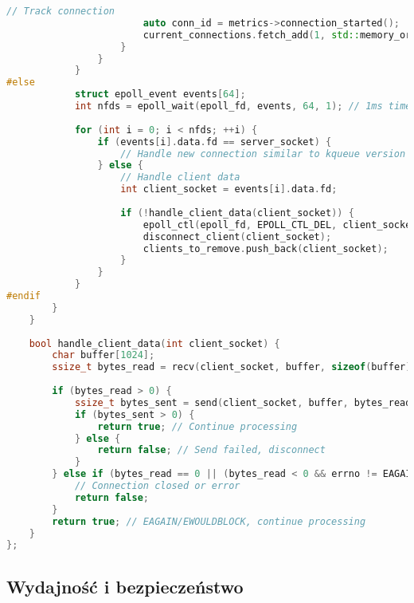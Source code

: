 \begin{lstlisting}[language=C++, caption={Async Echo Serwer w C++ z event loop}, label={lst:cpp_async_echo_server}]
                        // Track connection
                        auto conn_id = metrics->connection_started();
                        current_connections.fetch_add(1, std::memory_order_relaxed);
                    }
                }
            }
#else
            struct epoll_event events[64];
            int nfds = epoll_wait(epoll_fd, events, 64, 1); // 1ms timeout
            
            for (int i = 0; i < nfds; ++i) {
                if (events[i].data.fd == server_socket) {
                    // Handle new connection similar to kqueue version
                } else {
                    // Handle client data
                    int client_socket = events[i].data.fd;
                    
                    if (!handle_client_data(client_socket)) {
                        epoll_ctl(epoll_fd, EPOLL_CTL_DEL, client_socket, nullptr);
                        disconnect_client(client_socket);
                        clients_to_remove.push_back(client_socket);
                    }
                }
            }
#endif
        }
    }
    
    bool handle_client_data(int client_socket) {
        char buffer[1024];
        ssize_t bytes_read = recv(client_socket, buffer, sizeof(buffer), 0);
        
        if (bytes_read > 0) {
            ssize_t bytes_sent = send(client_socket, buffer, bytes_read, 0);
            if (bytes_sent > 0) {
                return true; // Continue processing
            } else {
                return false; // Send failed, disconnect
            }
        } else if (bytes_read == 0 || (bytes_read < 0 && errno != EAGAIN && errno != EWOULDBLOCK)) {
            // Connection closed or error
            return false;
        }
        return true; // EAGAIN/EWOULDBLOCK, continue processing
    }
};
\end{lstlisting}

\subsection{Wydajność i bezpieczeństwo}


